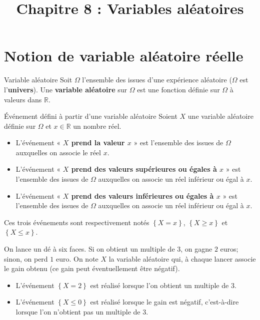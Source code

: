 \documentclass[11pt]{article}
\title{Chapitre 8 : Variables aléatoires}
\date{}
\author{}
\begin{document}
\maketitle\thispagestyle{fancy}

\section{Notion de variable aléatoire réelle}

\begin{defi}{Variable aléatoire}
  Soit $\Omega$ l'ensemble des issues d'une expérience aléatoire ($\Omega$ est
  l'\textbf{univers}). Une \textbf{variable aléatoire} sur $\Omega$ est une
  fonction définie sur $\Omega$ à valeurs dans $\mathbb{R}$.
\end{defi}

\begin{defi}{Événement défini à partir d'une variable aléatoire}
  Soient $X$ une variable aléatoire définie sur $\Omega$ et $x\in\mathbb{R}$ un
  nombre réel.
  \begin{itemize}
    \item L'événement « \textbf{$X$ prend la valeur $x$} » est l'ensemble des
      issues de $\Omega$ auxquelles on associe le réel $x$.
    \item L'événement « \textbf{$X$ prend des valeurs supérieures ou égales
      à $x$} » est l'ensemble des
      issues de $\Omega$ auxquelles on associe un réel inférieur ou égal à $x$.
    \item L'événement « \textbf{$X$ prend des valeurs inférieures ou égales
      à $x$} » est l'ensemble des
      issues de $\Omega$ auxquelles on associe un réel inférieur ou égal à $x$.
  \end{itemize}
\end{defi}
\begin{notation}
  Ces trois événements sont respectivement notés $\left\{ X=x \right\}$,
  $\left\{ X\geq x \right\}$ et $\left\{ X\leq x \right\}$.
\end{notation}

\begin{exemple}
  On lance un dé à six faces. Si on obtient un multiple de $3$, on gagne $2$
  euros; sinon, on perd $1$ euro. On note $X$ la variable aléatoire qui, à
  chaque lancer associe le gain obtenu (ce gain peut éventuellement être
  négatif).
  \begin{itemize}
    \item L'événement $\left\{ X=2 \right\}$ est réalisé lorsque l'on obtient un
      multiple de $3$.
    \item L'événement $\left\{ X\leq0 \right\}$ est réalisé lorsque le gain est
      négatif, c'est-à-dire lorsque l'on n'obtient pas un multiple de $3$.
  \end{itemize}
\end{exemple}
\end{document}
